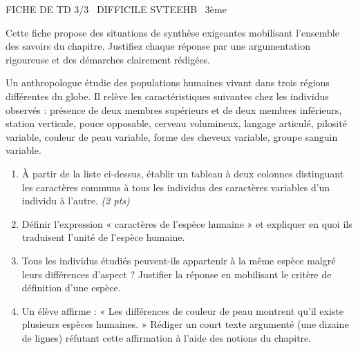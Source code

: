\documentclass[11pt]{article}
\begin{document}
\begin{tcolorbox}[enhanced,colback=popink,colframe=popink,arc=10pt,boxrule=0pt,left=12pt,right=12pt,top=9pt,bottom=9pt]
{\color{white}\popxbold\small FICHE DE TD 3/3 \textbullet\ DIFFICILE \hfill SVTEEHB \textbullet\ 3ème\par}
\end{tcolorbox}
\vspace{4pt}
Cette fiche propose des situations de synthèse exigeantes mobilisant l'ensemble des savoirs du chapitre. Justifiez chaque réponse par une argumentation rigoureuse et des démarches clairement rédigées.

\begin{exercice}
Un anthropologue étudie des populations humaines vivant dans trois régions différentes du globe. Il relève les caractéristiques suivantes chez les individus observés : présence de deux membres supérieurs et de deux membres inférieurs, station verticale, pouce opposable, cerveau volumineux, langage articulé, pilosité variable, couleur de peau variable, forme des cheveux variable, groupe sanguin variable.
\begin{enumerate}
\item À partir de la liste ci-dessus, établir un tableau à deux colonnes distinguant les caractères communs à tous les individus des caractères variables d'un individu à l'autre. \textit{(2 pts)}
\item Définir l'expression « caractères de l'espèce humaine » et expliquer en quoi ils traduisent l'unité de l'espèce humaine.
\item Tous les individus étudiés peuvent-ils appartenir à la même espèce malgré leurs différences d'aspect ? Justifier la réponse en mobilisant le critère de définition d'une espèce.
\item Un élève affirme : « Les différences de couleur de peau montrent qu'il existe plusieurs espèces humaines. » Rédiger un court texte argumenté (une dizaine de lignes) réfutant cette affirmation à l'aide des notions du chapitre.
\end{enumerate}
\end{exercice}
\end{document}

